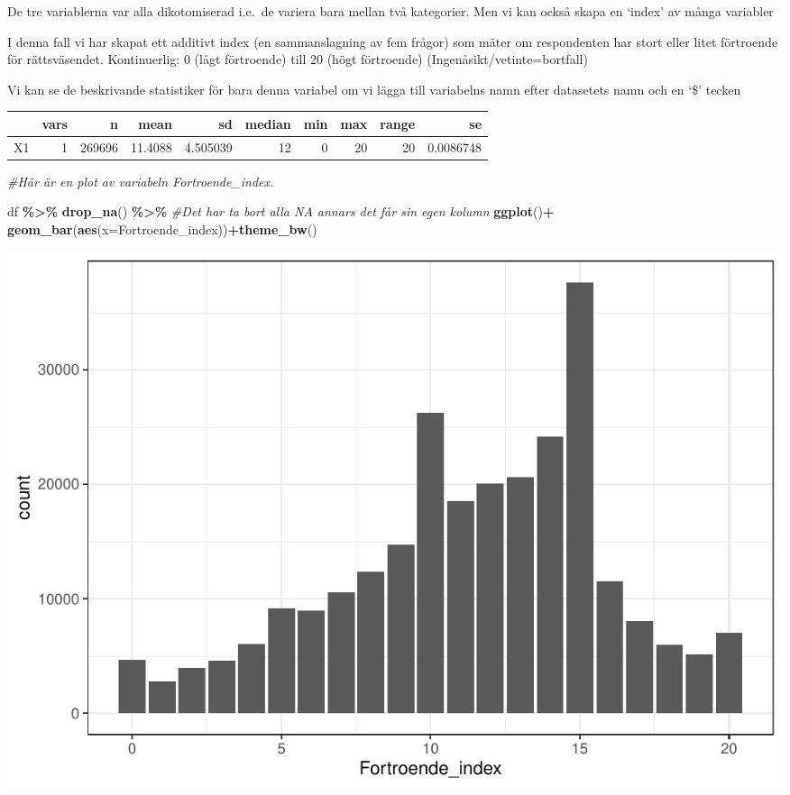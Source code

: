\documentclass[
]{book}
\newenvironment{Shaded}{\begin{snugshade}}{\end{snugshade}}
\newcommand{\AttributeTok}[1]{\textcolor[rgb]{0.13,0.29,0.53}{#1}}
\newcommand{\CommentTok}[1]{\textcolor[rgb]{0.56,0.35,0.01}{\textit{#1}}}
\newcommand{\ConstantTok}[1]{\textcolor[rgb]{0.56,0.35,0.01}{#1}}
\newcommand{\FunctionTok}[1]{\textcolor[rgb]{0.13,0.29,0.53}{\textbf{#1}}}
\newcommand{\NormalTok}[1]{#1}
\newcommand{\SpecialCharTok}[1]{\textcolor[rgb]{0.81,0.36,0.00}{\textbf{#1}}}
\begin{document}
De tre variablerna var alla dikotomiserad i.e.~de variera bara mellan
två kategorier. Men vi kan också skapa en `index' av många variabler

I denna fall vi har skapat ett additivt index (en sammanslagning av fem
frågor) som mäter om respondenten har stort eller litet förtroende för
rättsväsendet. Kontinuerlig: 0 (lågt förtroende) till 20 (högt
förtroende) (Ingenåsikt/vetinte=bortfall)

Vi kan se de beskrivande statistiker för bara denna variabel om vi lägga
till variabelns namn efter datasetets namn och en `\$' tecken

\begin{Shaded}
\end{Shaded}

\begin{tabular}{l|r|r|r|r|r|r|r|r|r}
\hline
  & vars & n & mean & sd & median & min & max & range & se\\
\hline
X1 & 1 & 269696 & 11.4088 & 4.505039 & 12 & 0 & 20 & 20 & 0.0086748\\
\hline
\end{tabular}

\begin{Shaded}
\begin{Highlighting}[]
\CommentTok{\#Här är en plot av variabeln \textquotesingle{}Fortroende\_index\textquotesingle{}.  }

\NormalTok{df }\SpecialCharTok{\%\textgreater{}\%} \FunctionTok{drop\_na}\NormalTok{() }\SpecialCharTok{\%\textgreater{}\%} \CommentTok{\#Det har ta bort alla NA annars det får sin egen kolumn}
  \FunctionTok{ggplot}\NormalTok{()}\SpecialCharTok{+} \FunctionTok{geom\_bar}\NormalTok{(}\FunctionTok{aes}\NormalTok{(}\AttributeTok{x=}\NormalTok{Fortroende\_index))}\SpecialCharTok{+}\FunctionTok{theme\_bw}\NormalTok{()}
\end{Highlighting}
\end{Shaded}

\includegraphics{_main_files/figure-latex/unnamed-chunk-10-1.pdf}
\end{document}
